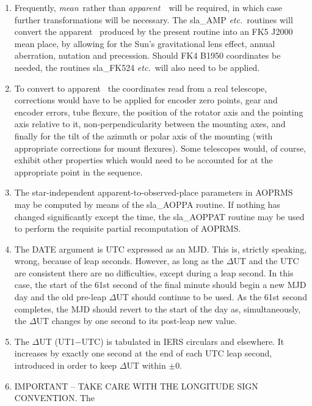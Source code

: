 {\begin{enumerate}
  \item Frequently, {\it mean}\, rather than {\it apparent}\,
        \radec\ will be required,
        in which case further transformations will be necessary.  The
        sla\_AMP {\it etc.}\ routines will convert
        the apparent \radec\ produced
        by the present routine into an FK5 J2000 mean place, by
        allowing for the Sun's gravitational lens effect, annual
        aberration, nutation and precession.  Should FK4 B1950
        coordinates be needed, the routines sla\_FK524 {\it etc.}\ will also
        need to be applied.
  \item To convert to apparent \radec\ the coordinates read from a
        real telescope, corrections would have to be applied for
        encoder zero points, gear and encoder errors, tube flexure,
        the position of the rotator axis and the pointing axis
        relative to it, non-perpendicularity between the mounting
        axes, and finally for the tilt of the azimuth or polar axis
        of the mounting (with appropriate corrections for mount
        flexures).  Some telescopes would, of course, exhibit other
        properties which would need to be accounted for at the
        appropriate point in the sequence.
  \item The star-independent apparent-to-observed-place parameters
        in AOPRMS may be computed by means of the sla\_AOPPA routine.
        If nothing has changed significantly except the time, the
        sla\_AOPPAT routine may be used to perform the requisite
        partial recomputation of AOPRMS.
  \item The DATE argument is UTC expressed as an MJD.  This is,
        strictly speaking, wrong, because of leap seconds.  However,
        as long as the $\Delta$UT and the UTC are consistent there
        are no difficulties, except during a leap second.  In this
        case, the start of the 61st second of the final minute should
        begin a new MJD day and the old pre-leap $\Delta$UT should
        continue to be used.  As the 61st second completes, the MJD
        should revert to the start of the day as, simultaneously,
        the $\Delta$UT changes by one second to its post-leap new value.
  \item The $\Delta$UT (UT1$-$UTC) is tabulated in IERS circulars and
        elsewhere.  It increases by exactly one second at the end of
        each UTC leap second, introduced in order to keep $\Delta$UT
        within $\pm0$.
  \item IMPORTANT -- TAKE CARE WITH THE LONGITUDE SIGN CONVENTION.  The

\end{enumerate}}
